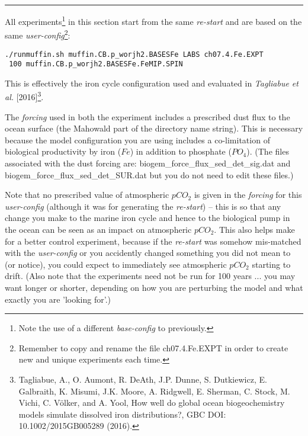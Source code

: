 \vspace{1mm}
\noindent\rule{4cm}{0.1mm}
\vspace{2mm}

\newpage
%
\vspace{2mm}

\noindent All experiments\footnote{Note the use of a different \textit{base-config} to previously.} in this section  start from the same \textit{re-start} and are based on the same \textit{user-config}\footnote{Remember to copy and rename the file \textsf{\footnotesize ch07.4.Fe.EXPT} in order to create new and unique experiments each time.}:
\vspace{-1mm}\small\begin{verbatim}
./runmuffin.sh muffin.CB.p_worjh2.BASESFe LABS ch07.4.Fe.EXPT
 100 muffin.CB.p_worjh2.BASESFe.FeMIP.SPIN
\end{verbatim}\normalsize\vspace{-1mm}
This is effectively the iron cycle configuration used and evaluated in \textit{Tagliabue et al.} [2016]\footnote{Tagliabue, A., O. Aumont, R. DeAth, J.P. Dunne, S. Dutkiewicz, E. Galbraith, K. Misumi, J.K. Moore, A. Ridgwell, E. Sherman, C. Stock, M. Vichi, C. Völker, and A. Yool, How well do global ocean biogeochemistry models simulate dissolved iron distributions?, GBC DOI: 10.1002/2015GB005289 (2016).}.

\vspace{1mm}
The \textit{forcing} used in both the experiment includes a prescribed dust flux to the ocean surface (the \textsf{\footnotesize Mahowald} part of the directory name string). This is necessary because the model configuration you are using includes a co-limitation of biological productivity by iron (\(Fe\)) in addition to phosphate (\(PO_{4}\)). (The files associated with the dust forcing are: \textsf{\footnotesize biogem\_force\_flux\_sed\_det\_sig.dat} and \textsf{\footnotesize biogem\_force\_flux\_sed\_det\_SUR.dat} but you do not need to edit these files.) 

\vspace{1mm}
Note that no prescribed value of atmospheric \(pCO_{2}\) is given in the \textit{forcing} for this \textit{user-config} (although it was for generating the \textit{re-start}) -- this is so that any change you make to the marine iron cycle and hence to the biological pump in the ocean can be seen as an impact on atmospheric \(pCO_{2}\). This also helps make for a better control experiment, because if the \textit{re-start} was somehow mis-matched with the \textit{user-config}  or you accidently changed something you did not mean to (or notice), you could expect to immediately see atmospheric \(pCO_{2}\) starting to drift. (Also note that the experiments need not be run for 100 years ... you may want longer or shorter, depending on how you are perturbing the model and what exactly you are 'looking for'.)

